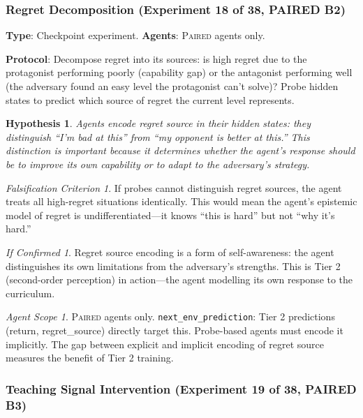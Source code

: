 \documentclass[11pt,a4paper]{article}
\newtheorem{hypothesis}{Hypothesis}[subsection]
\theoremstyle{remark}
\newtheorem*{falsification}{Falsification Criterion}
\newtheorem*{implication}{If Confirmed}
\newtheorem*{agentscope}{Agent Scope}
\newcommand{\paired}{\textsc{Paired}}
\begin{document}
\subsubsection{Regret Decomposition (Experiment 18 of 38, PAIRED B2)}
\label{exp:regret_decomposition}

\textbf{Type}: Checkpoint experiment. \textbf{Agents}: \paired{} agents only.

\textbf{Protocol}: Decompose regret into its sources: is high regret due to the protagonist performing poorly (capability gap) or the antagonist performing well (the adversary found an easy level the protagonist can't solve)? Probe hidden states to predict which source of regret the current level represents.

\begin{hypothesis}
Agents encode regret source in their hidden states: they distinguish ``I'm bad at this'' from ``my opponent is better at this.'' This distinction is important because it determines whether the agent's response should be to improve its own capability or to adapt to the adversary's strategy.
\end{hypothesis}

\begin{falsification}
If probes cannot distinguish regret sources, the agent treats all high-regret situations identically. This would mean the agent's epistemic model of regret is undifferentiated---it knows ``this is hard'' but not ``why it's hard.''
\end{falsification}

\begin{implication}
Regret source encoding is a form of self-awareness: the agent distinguishes its own limitations from the adversary's strengths. This is Tier 2 (second-order perception) in action---the agent modelling its own response to the curriculum.
\end{implication}

\begin{agentscope}
\paired{} agents only. \texttt{next\_env\_prediction}: Tier 2 predictions (return, regret\_source) directly target this. Probe-based agents must encode it implicitly. The gap between explicit and implicit encoding of regret source measures the benefit of Tier 2 training.
\end{agentscope}

\subsubsection{Teaching Signal Intervention (Experiment 19 of 38, PAIRED B3)}
\label{exp:teaching_signal_intervention}
\end{document}
